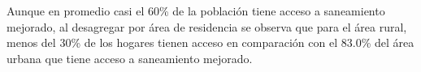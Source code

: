 Aunque en promedio casi el 60\% de la población tiene acceso a saneamiento mejorado, al desagregar por área de residencia se observa que para el área rural, menos del 30\% de los hogares tienen acceso en comparación con el 83.0\% del área urbana que tiene acceso a saneamiento mejorado.